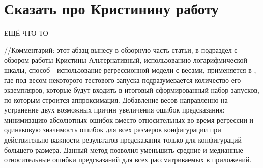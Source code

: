 	\section{Сказать про Кристинину работу}

	ЕЩЁ ЧТО-ТО
	
	//Комментарий: этот абзац вынесу в обзорную часть статьи, в подраздел с обзором работы Кристины
	Альтернативный, использованию логарифмической шкалы, способ - использование регрессионной модели с весами, применяется в \cite{Kazmina_DIPLOMMMM}, где под весом некоторого тестового запуска подразумевается количество его экземпляров, которые будут входить в итоговый сформированный набор запусков, по которым строится аппроксимация. Добавление весов направленно на устранение двух возможных причин увеличения ошибок предсказания: минимизацию абсолютных ошибок вместо относительных во время регрессии и одинаковую значимость ошибок для всех размеров конфигурации при действительно важности результатов предсказания только для конфигураций большего размера. Данный метод позволил уменьшить средние и медианные относительные ошибки предсказаний для всех рассматриваемых в \cite{KRISININ_DIPLOM} приложений.%




